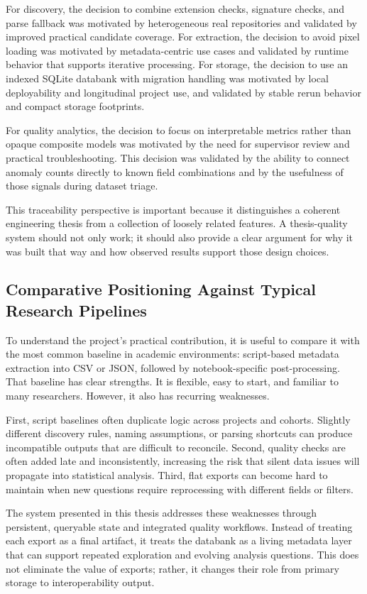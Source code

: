For discovery, the decision to combine extension checks, signature checks, and parse fallback was motivated by heterogeneous real repositories and validated by improved practical candidate coverage. For extraction, the decision to avoid pixel loading was motivated by metadata-centric use cases and validated by runtime behavior that supports iterative processing. For storage, the decision to use an indexed SQLite databank with migration handling was motivated by local deployability and longitudinal project use, and validated by stable rerun behavior and compact storage footprints.

For quality analytics, the decision to focus on interpretable metrics rather than opaque composite models was motivated by the need for supervisor review and practical troubleshooting. This decision was validated by the ability to connect anomaly counts directly to known field combinations and by the usefulness of those signals during dataset triage.

This traceability perspective is important because it distinguishes a coherent engineering thesis from a collection of loosely related features. A thesis-quality system should not only work; it should also provide a clear argument for why it was built that way and how observed results support those design choices.

\subsection{Comparative Positioning Against Typical Research Pipelines}
To understand the project's practical contribution, it is useful to compare it with the most common baseline in academic environments: script-based metadata extraction into CSV or JSON, followed by notebook-specific post-processing. That baseline has clear strengths. It is flexible, easy to start, and familiar to many researchers. However, it also has recurring weaknesses.

First, script baselines often duplicate logic across projects and cohorts. Slightly different discovery rules, naming assumptions, or parsing shortcuts can produce incompatible outputs that are difficult to reconcile. Second, quality checks are often added late and inconsistently, increasing the risk that silent data issues will propagate into statistical analysis. Third, flat exports can become hard to maintain when new questions require reprocessing with different fields or filters.

The system presented in this thesis addresses these weaknesses through persistent, queryable state and integrated quality workflows. Instead of treating each export as a final artifact, it treats the databank as a living metadata layer that can support repeated exploration and evolving analysis questions. This does not eliminate the value of exports; rather, it changes their role from primary storage to interoperability output.

